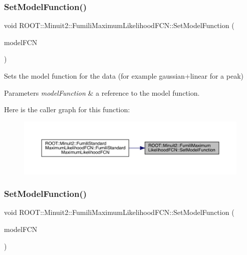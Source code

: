 \subsubsection{\texorpdfstring{SetModelFunction()}{SetModelFunction()}\hspace{0.1cm}{\footnotesize\ttfamily [1/3]}}
{\footnotesize\ttfamily void R\+O\+O\+T\+::\+Minuit2\+::\+Fumili\+Maximum\+Likelihood\+F\+C\+N\+::\+Set\+Model\+Function (\begin{DoxyParamCaption}\item[{const \mbox{\hyperlink{classROOT_1_1Minuit2_1_1ParametricFunction}{Parametric\+Function}} \&}]{model\+F\+CN }\end{DoxyParamCaption})\hspace{0.3cm}{\ttfamily [inline]}}

Sets the model function for the data (for example gaussian+linear for a peak)


\begin{DoxyParams}{Parameters}
{\em model\+Function} & a reference to the model function. \\
\hline
\end{DoxyParams}
Here is the caller graph for this function\+:
\nopagebreak
\begin{figure}[H]
\begin{center}
\leavevmode
\includegraphics[width=350pt]{dd/d54/classROOT_1_1Minuit2_1_1FumiliMaximumLikelihoodFCN_a1aef27a37fc3a8df63aed6aff19c0c33_icgraph}
\end{center}
\end{figure}
\mbox{\label{classROOT_1_1Minuit2_1_1FumiliMaximumLikelihoodFCN_a1aef27a37fc3a8df63aed6aff19c0c33}} 
\subsubsection{\texorpdfstring{SetModelFunction()}{SetModelFunction()}\hspace{0.1cm}{\footnotesize\ttfamily [2/3]}}
{\footnotesize\ttfamily void R\+O\+O\+T\+::\+Minuit2\+::\+Fumili\+Maximum\+Likelihood\+F\+C\+N\+::\+Set\+Model\+Function (\begin{DoxyParamCaption}\item[{const \mbox{\hyperlink{classROOT_1_1Minuit2_1_1ParametricFunction}{Parametric\+Function}} \&}]{model\+F\+CN }\end{DoxyParamCaption})\hspace{0.3cm}{\ttfamily [inline]}}

